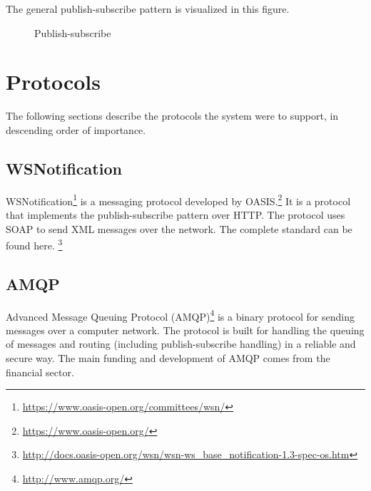 The general publish-subscribe pattern is visualized in this figure.

\begin{center}
  \begin{figure}[ht]
    \caption{Publish-subscribe}
    \label{fig:publish-subscribe}
  \end{figure}
\end{center}

\section{Protocols}

The following sections describe the protocols the system were to support, in descending order of importance.

\subsection{WSNotification}

WSNotification\footnote{\url{https://www.oasis-open.org/committees/wsn/}} is a messaging protocol developed by OASIS.\footnote{\url{https://www.oasis-open.org/}} It is a protocol that implements the publish-subscribe pattern over HTTP. The protocol uses SOAP to send XML messages over the network. The complete standard can be found here. \footnote{\url{http://docs.oasis-open.org/wsn/wsn-ws_base_notification-1.3-spec-os.htm}}

\subsection{AMQP}
Advanced Message Queuing Protocol (AMQP)\footnote{\url{http://www.amqp.org/}} is a binary protocol for sending messages over a computer network. The protocol is built for handling the queuing of messages and routing (including publish-subscribe handling) in a reliable and secure way. The main funding and development of AMQP comes from the financial sector.

